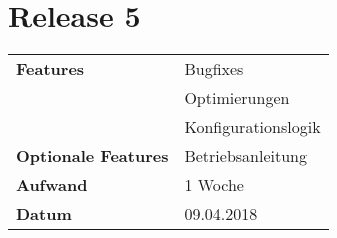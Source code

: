 \section*{Release 5}
\label{sec:release_5}

\begin{tabular}{p{5cm} p{9cm}}
    \textbf{Features} &  Bugfixes \\
    & Optimierungen \\
    & Konfigurationslogik \\
    \textbf{Optionale Features} &  Betriebsanleitung \\
    \hline
    \textbf{Aufwand} & 1 Woche\\
    \hline
    \textbf{Datum} & 09.04.2018
\end{tabular}
